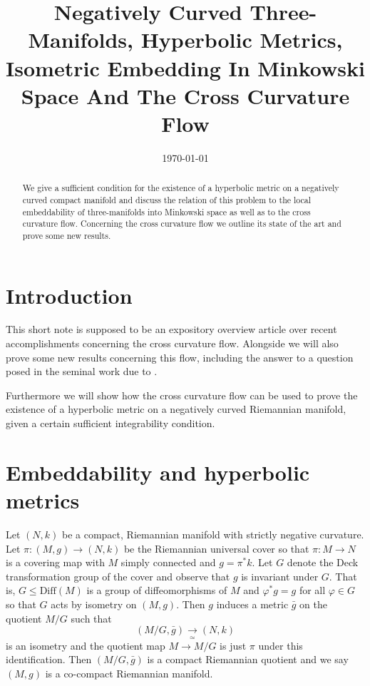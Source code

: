 \documentclass[a4paper,12pt]{amsart}
\begin{document}
\title[Negatively Curved Three Manifolds]{Negatively Curved Three-Manifolds, Hyperbolic Metrics, Isometric Embedding In Minkowski Space And The Cross Curvature Flow}

\date{\today}



\begin{abstract}
We give a sufficient condition for the existence of a hyperbolic metric on a negatively curved compact manifold and discuss the relation of this problem to the local embeddability of three-manifolds into Minkowski space as well as to the cross curvature flow. Concerning the cross curvature flow we outline its state of the art and prove some new results. 
\end{abstract}

\maketitle

\section{Introduction}
This short note is supposed to be an expository overview article over recent accomplishments concerning the cross curvature flow. Alongside we will also prove some new results concerning this flow, including the answer to a question posed in the seminal work due to \cite{MR2055396}.

Furthermore we will show how the cross curvature flow can be used to prove the existence of a hyperbolic metric on a negatively curved Riemannian manifold, given a certain sufficient integrability condition.




\section{Embeddability and hyperbolic metrics}
\label{sec:intro}



Let \((N, k)\) be a compact, Riemannian manifold with strictly negative curvature. Let \(\pi\colon (M, g) \to (N, k)\) be the Riemannian universal cover so that \(\pi : M \to N\) is a covering map with \(M\) simply connected and \(g = \pi^{\ast} k\). Let \(G\) denote the Deck transformation group of the cover and observe that \(g\) is invariant under \(G\). That is, \(G \leq \text{Diff}(M)\) is a group of diffeomorphisms of \(M\) and \(\varphi^{\ast} g = g\) for all \(\varphi \in G\) so that \(G\) acts by isometry on \((M, g)\). Then \(g\) induces a metric \(\bar{g}\) on the quotient \(M/G\) such that
\[
(M/G, \bar{g}) \underset{\simeq}{\to} (N, k)
\]
is an isometry and the quotient map \(M \to M/G\) is just \(\pi\) under this identification. Then \((M/G, \bar{g})\) is a compact Riemannian quotient and we say \((M, g)\) is a co-compact Riemannian manifold.
\end{document}
